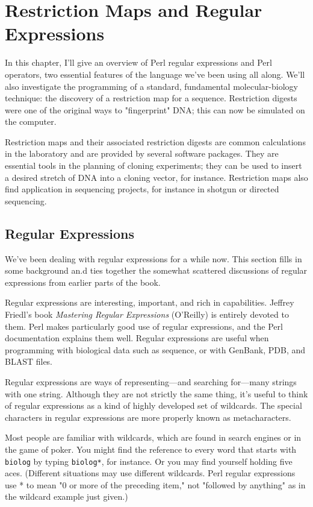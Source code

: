 \chapter{Restriction Maps and Regular Expressions}
\label{chap:chapter9}
\minitoc

In this chapter, I'll give an overview of Perl regular expressions and Perl operators, two essential features of the language we've been using all along. We'll also investigate the programming of a standard, fundamental molecular-biology technique: the discovery of a restriction map for a sequence. Restriction digests were one of the original ways to "fingerprint" DNA; this can now be simulated on the computer.

Restriction maps and their associated restriction digests are common calculations in the laboratory and are provided by several software packages. They are essential tools in the planning of cloning experiments; they can be used to insert a desired stretch of DNA into a cloning vector, for instance. Restriction maps also find application in sequencing projects, for instance in shotgun or directed sequencing.

\section{Regular Expressions}
We've been dealing with regular expressions for a while now. This section fills in some background an.d ties together the somewhat scattered discussions of regular expressions from earlier parts of the book.

Regular expressions are interesting, important, and rich in capabilities. Jeffrey Friedl's book \textit{Mastering Regular Expressions} (O'Reilly) is entirely devoted to them. Perl makes particularly good use of regular expressions, and the Perl documentation explains them well.  Regular expressions are useful when programming with biological data such as sequence, or with GenBank, PDB, and BLAST files.

Regular expressions are ways of representing—and searching for—many strings with one string. Although they are not strictly the same thing, it's useful to think of regular expressions as a kind of highly developed set of wildcards. The special characters in regular expressions are more properly known as metacharacters.

Most people are familiar with wildcards, which are found in search engines or in the game of poker. You might find the reference to every word that starts with \verb|biolog| by typing \verb|biolog*|, for instance. Or you may find yourself holding five aces. (Different situations may use different wildcards. Perl regular expressions use * to mean "0 or more of the preceding item," not "followed by anything" as in the wildcard example just given.)

